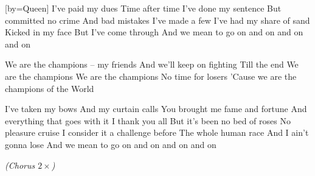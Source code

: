 [by={Queen}]
\beginverse
I've paid my dues
Time after time
I've done my sentence
But committed no crime
And bad mistakes
I've made a few
I've had my share of sand
Kicked in my face
But I've come through
And we mean to go on and on and on and on
\endverse

\beginchorus
We are the champions -- my friends
And we'll keep on fighting
Till the end
We are the champions
We are the champions
No time for losers
'Cause we are the champions of the World
\endchorus 

\beginverse
I've taken my bows
And my curtain calls
You brought me fame and fortune
And everything that goes with it
I thank you all
But it's been no bed of roses
No pleasure cruise
I consider it a challenge before
The whole human race
And I ain't gonna lose
And we mean to go on and on and on and on
\endverse

\beginchorus
\textit{(Chorus $2\times$)}
\endchorus 
\endsong

